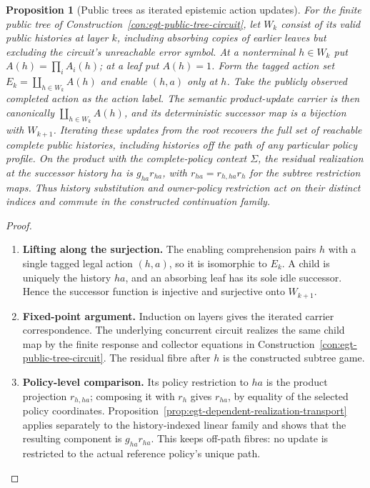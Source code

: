 \documentclass[11pt,a4paper]{article}
\numberwithin{equation}{section}
\newtheorem{proposition}[theorem]{Proposition}
\theoremstyle{definition}
\theoremstyle{remark}
\theoremstyle{plain}
\begin{document}
\begin{proposition}[Public trees as iterated epistemic action updates]
\label{prop:egt-public-tree-action-update}
For the finite public tree of
Construction~\ref{con:egt-public-tree-circuit}, let $W_k$ consist of
its valid public histories at layer $k$, including absorbing copies of
earlier leaves but excluding the circuit's unreachable error symbol.
At a nonterminal $h\in W_k$ put
$A(h)=\prod_iA_i(h)$; at a leaf put $A(h)=1$. Form the tagged action
set $E_k=\coprod_{h\in W_k}A(h)$ and enable $(h,a)$ only at $h$.
Take the publicly observed completed action as the action label.
The semantic product-update carrier is then canonically
$\coprod_{h\in W_k}A(h)$, and its deterministic successor map is a
bijection with $W_{k+1}$. Iterating these updates from the root recovers
the full set of reachable complete public histories, including
histories off the path of any particular policy profile. On the
product with the complete-policy context $\Sigma$, the residual
realization at the successor history $ha$ is $g_{ha}r_{ha}$, with
$r_{ha}=r_{h,ha}r_h$ for the subtree restriction maps. Thus history
substitution and owner-policy restriction act on their distinct indices
and commute in the constructed continuation family.
\end{proposition}
\begin{proof}
\leavevmode
\begin{enumerate}[label=\textup{(\arabic*)},leftmargin=*,itemsep=4pt,topsep=3pt]
  \item \textbf{Lifting along the surjection.} The enabling comprehension pairs $h$ with a single tagged legal action
$(h,a)$, so it is isomorphic to $E_k$. A child is uniquely the history
$ha$, and an absorbing leaf has its sole idle successor. Hence the
successor function is injective and surjective onto $W_{k+1}$.
  \item \textbf{Fixed-point argument.} Induction on layers gives the iterated carrier correspondence. The
underlying concurrent circuit realizes the same child map by the
finite response and collector equations in
Construction~\ref{con:egt-public-tree-circuit}. The residual fibre
after $h$ is the constructed subtree game.
  \item \textbf{Policy-level comparison.} Its policy restriction to
$ha$ is the product projection $r_{h,ha}$; composing it with $r_h$
gives $r_{ha}$, by equality of the selected policy coordinates. Proposition~\ref{prop:egt-dependent-realization-transport} applies
separately to the history-indexed linear family and shows that the
resulting component is $g_{ha}r_{ha}$. This keeps off-path fibres: no
update is restricted to the actual reference policy's unique path.
\end{enumerate}
\end{proof}
\end{document}
